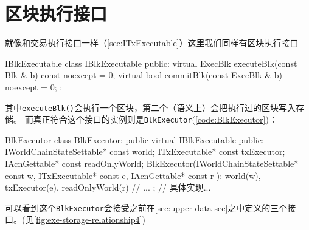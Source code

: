 \section{区块执行接口}
\label{sec:IBlkExecutable}

就像和交易执行接口一样（\cref{sec:ITxExecutable}）这里我们同样有区块执行接口
\begin{numberedc}{IBlkExecutable}{\label{code:IBlkExecutable}}
  class IBlkExecutable {
  public:
    virtual ExecBlk executeBlk(const Blk & b) const noexcept = 0;
    virtual bool commitBlk(const ExecBlk & b) noexcept = 0;
  };
\end{numberedc}
其中\texttt{executeBlk()}会执行一个区块，第二个（语义上）会把执行过的区块写入存储。
而真正符合这个接口的实例则是\texttt{BlkExecutor}(\cref{code:BlkExecutor})：

\begin{numberedc}{BlkExecutor}{\label{code:BlkExecutor}}
class BlkExecutor: public virtual IBlkExecutable{
public:
  IWorldChainStateSettable* const world;
  ITxExecutable* const txExecutor;
  IAcnGettable* const readOnlyWorld;
  BlkExecutor(IWorldChainStateSettable* const w,
              ITxExecutable* const e,
              IAcnGettable* const r
              ): world(w),
                 txExecutor(e),
                 readOnlyWorld(r){
    // ...
  };
  // 具体实现...
}
\end{numberedc}

可以看到这个\texttt{BlkExecutor}会接受之前在\cref{sec:upper-data-sec}之中定义的三个接口。(见\ref{fig:exe-storage-relationship4})

